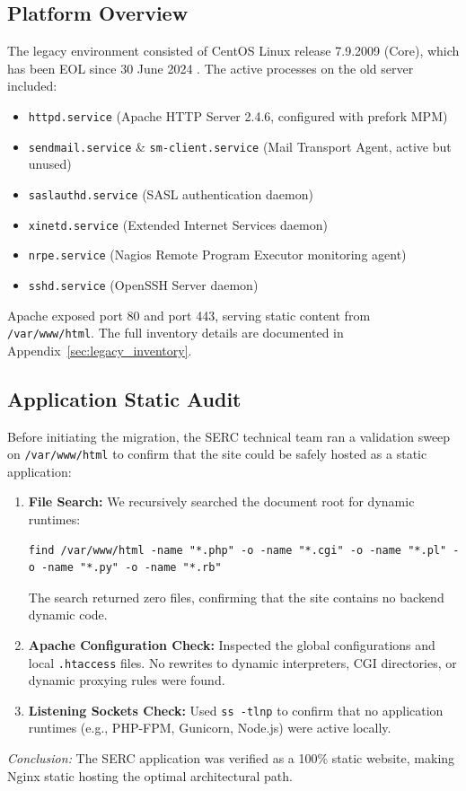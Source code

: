 \documentclass[11pt,a4paper,DIV=16,headings=normal,parskip=half]{scrartcl}
\begin{document}
\subsection{Platform Overview}
The legacy environment consisted of CentOS Linux release 7.9.2009 (Core), which has been EOL since 30 June 2024 \cite{centos7-eol}. The active processes on the old server included:
\begin{itemize}
\item \texttt{httpd.service} (Apache HTTP Server 2.4.6, configured with prefork MPM)
\item \texttt{sendmail.service} \& \texttt{sm-client.service} (Mail Transport Agent, active but unused)
\item \texttt{saslauthd.service} (SASL authentication daemon)
\item \texttt{xinetd.service} (Extended Internet Services daemon)
\item \texttt{nrpe.service} (Nagios Remote Program Executor monitoring agent)
\item \texttt{sshd.service} (OpenSSH Server daemon)
\end{itemize}
Apache exposed port 80 and port 443, serving static content from \texttt{/var/www/html}. The full inventory details are documented in Appendix~\ref{sec:legacy_inventory}.

\subsection{Application Static Audit}
Before initiating the migration, the SERC technical team ran a validation sweep on \texttt{/var/www/html} to confirm that the site could be safely hosted as a static application:
\begin{enumerate}
\item \textbf{File Search:} We recursively searched the document root for dynamic runtimes:
\begin{lstlisting}
find /var/www/html -name "*.php" -o -name "*.cgi" -o -name "*.pl" -o -name "*.py" -o -name "*.rb"
\end{lstlisting}
The search returned zero files, confirming that the site contains no backend dynamic code.
\item \textbf{Apache Configuration Check:} Inspected the global configurations and local \texttt{.htaccess} files. No rewrites to dynamic interpreters, CGI directories, or dynamic proxying rules were found.
\item \textbf{Listening Sockets Check:} Used \texttt{ss -tlnp} to confirm that no application runtimes (e.g., PHP-FPM, Gunicorn, Node.js) were active locally.
\end{enumerate}
\textit{Conclusion:} The SERC application was verified as a 100\% static website, making Nginx static hosting the optimal architectural path.
\end{document}
